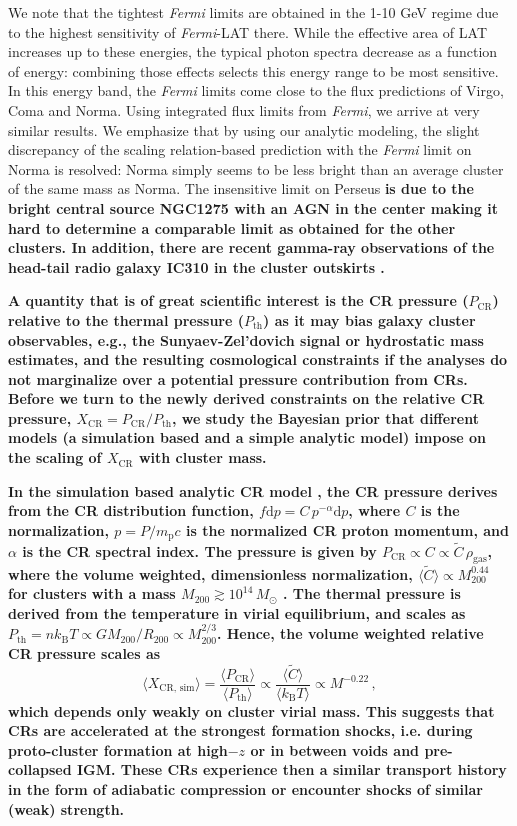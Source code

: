 \documentclass[10pt,aps,pra,reprint,amsmath,amsfonts,amssymb,showpacs,nofootinbib,floatfix]{revtex4-1}
\def\C#1{{\bf #1}}
\newcommand{\Fermi}{{\em Fermi}\xspace}
\newcommand{\rmn}{\mathrm}
\newcommand{\msun}{M_\odot}
\newcommand{\B}{\rmn{B}}
\newcommand{\bra}{\langle}
\newcommand{\ket}{\rangle}
\newcommand{\dd}{\rmn{d}}
\newcommand{\CR}{\rmn{CR}}
\newcommand{\mvir}{M_{200}}
\begin{document}
We note that the tightest \Fermi limits are obtained in the 1-10 GeV regime due
to the highest sensitivity of \Fermi-LAT there. While the effective area of LAT
increases up to these energies, the typical photon spectra decrease as a
function of energy: combining those effects selects this energy range to be most
sensitive.  In this energy band, the \Fermi limits come close to the flux
predictions of Virgo, Coma and Norma. Using integrated flux limits from \Fermi,
we arrive at very similar results.  We emphasize that by using our analytic
modeling, the slight discrepancy of the scaling relation-based prediction with
the \Fermi limit on Norma \cite{2010ApJ...717L..71A} is resolved: Norma simply
seems to be less bright than an average cluster of the same mass as Norma. The
insensitive limit on Perseus \C{is due to the bright central source NGC1275 with
  an AGN in the center \cite{2010ATel.2916....1M} making it hard to determine a
  comparable limit as obtained for the other clusters. In addition, there are
  recent gamma-ray observations of the head-tail radio galaxy IC310 in the
  cluster outskirts \cite{2010ApJ...723L.207A,2010A&A...519L...6N}.}

\C{A quantity that is of great scientific interest is the CR pressure ($P_\CR$)
  relative to the thermal pressure ($P_\rmn{th}$) as it may bias galaxy cluster
  observables, e.g., the Sunyaev-Zel’dovich signal or hydrostatic mass
  estimates, and the resulting cosmological constraints if the analyses do not
  marginalize over a potential pressure contribution from CRs. Before we turn to
  the newly derived constraints on the relative CR pressure, $X_\CR =
  P_\CR/P_\rmn{th}$, we study the Bayesian prior that different models (a
  simulation based and a simple analytic model) impose on the scaling of $X_\CR$
  with cluster mass.}

\C{In the simulation based analytic CR model \cite{2010MNRAS.409..449P}, the CR
  pressure derives from the CR distribution function, $f\dd p =
  C\,p^{-\alpha}\dd p$, where $C$ is the normalization, $p=P/m_\rmn{p} c$ is the
  normalized CR proton momentum, and $\alpha$ is the CR spectral index. The
  pressure is given by $P_\CR \propto C\propto \tilde{C} \,\rho_\rmn{gas}$,
  where the volume weighted, dimensionless normalization,
  $\bra\tilde{C}\ket\propto \mvir^{0.44}$ for clusters with a mass $\mvir\gtrsim
  10^{14}\,\msun$ \cite{2010MNRAS.409..449P}. The thermal pressure is derived
  from the temperature in virial equilibrium, and scales as $P_\rmn{th}= n k_\B
  T \propto G \mvir/R_{200} \propto \mvir^{2/3}$. Hence, the volume weighted
  relative CR pressure scales as
  \begin{equation}
    \bra X_{\CR,\,\rmn{sim}}\ket = \frac{\bra P_\CR\ket}{\bra P_\rmn{th}\ket} 
    \propto \frac{\bra\tilde{C}\ket}{\bra k_\B T\ket} \propto M^{-0.22}\,,
  \end{equation}
  which depends only weakly on cluster virial mass. This suggests that
  CRs are accelerated at the strongest formation shocks, i.e. during
  proto-cluster formation at high$-z$ or in between voids and
  pre-collapsed IGM. These CRs experience then a similar transport
  history in the form of adiabatic compression or encounter shocks of
  similar (weak) strength.}
\end{document}
